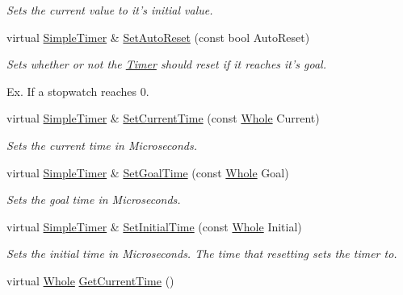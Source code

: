 \begin{DoxyCompactItemize}
\begin{DoxyCompactList}\small\item\em Sets the current value to it's initial value. \item\end{DoxyCompactList}\item 
virtual \hyperlink{classphys_1_1SimpleTimer}{SimpleTimer} \& \hyperlink{classphys_1_1SimpleTimer_a5a278c256d292a68ffbb35f8db9cb445}{SetAutoReset} (const bool AutoReset)
\begin{DoxyCompactList}\small\item\em Sets whether or not the \hyperlink{classphys_1_1Timer}{Timer} should reset if it reaches it's goal. \par
 Ex. If a stopwatch reaches 0. \item\end{DoxyCompactList}\item 
virtual \hyperlink{classphys_1_1SimpleTimer}{SimpleTimer} \& \hyperlink{classphys_1_1SimpleTimer_a1c874c4e367d582ab0006e7cdb8be0d5}{SetCurrentTime} (const \hyperlink{namespacephys_a460f6bc24c8dd347b05e0366ae34f34a}{Whole} Current)
\begin{DoxyCompactList}\small\item\em Sets the current time in Microseconds. \item\end{DoxyCompactList}\item 
virtual \hyperlink{classphys_1_1SimpleTimer}{SimpleTimer} \& \hyperlink{classphys_1_1SimpleTimer_a09ad426a36971257d2f800075f562eda}{SetGoalTime} (const \hyperlink{namespacephys_a460f6bc24c8dd347b05e0366ae34f34a}{Whole} Goal)
\begin{DoxyCompactList}\small\item\em Sets the goal time in Microseconds. \item\end{DoxyCompactList}\item 
virtual \hyperlink{classphys_1_1SimpleTimer}{SimpleTimer} \& \hyperlink{classphys_1_1SimpleTimer_a00bf7f837c8ed515a65bd8dbf6d9d593}{SetInitialTime} (const \hyperlink{namespacephys_a460f6bc24c8dd347b05e0366ae34f34a}{Whole} Initial)
\begin{DoxyCompactList}\small\item\em Sets the initial time in Microseconds. The time that resetting sets the timer to. \item\end{DoxyCompactList}\item 
virtual \hyperlink{namespacephys_a460f6bc24c8dd347b05e0366ae34f34a}{Whole} \hyperlink{classphys_1_1SimpleTimer_aa0cda0797bfb501240016177ff1450a5}{GetCurrentTime} ()

\end{DoxyCompactItemize}
